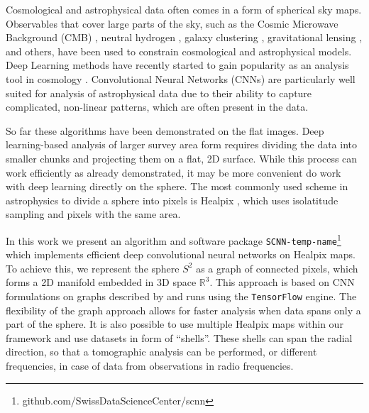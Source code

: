 \documentclass[final,twocolumn,3p,times,authoryear]{elsarticle}
\newcommand{\1}{\b{1}}              %
\newcommand{\0}{\b{0}}              %
\newcommand{\pkg}[1]{\texttt{#1}}
\begin{document}
Cosmological and astrophysical data often comes in a form of spherical sky maps.
Observables that cover large parts of the sky, such as the Cosmic Microwave Background (CMB) \citep{planck2015cosmologicalparameters,komatsu2011sevenyear,staggs2018recentdiscoveries}, neutral hydrogen \citep{santos2015cosmologySKA,HI4PI2016fullskyHI}, galaxy clustering \citep{alam2017clusteringgalaxies}, gravitational lensing \citep{troxel2017darkenergy,hildebrandt2017kidscosmological}, and others, have been used to constrain cosmological and astrophysical models. Deep Learning methods have recently started to gain popularity as an analysis tool in cosmology \citep{schmelze2017cosmologicalmodel,luciesmith2018machinelearning,gupta2018nongaussianinformation,gillet2018deeplearning,hassan2018reionizationmodels,aragoncalvo2018classyfyinglarge,ciuca2017cnnstring}.
Convolutional Neural Networks (CNNs) are particularly well suited for analysis of astrophysical data due to their ability to capture complicated, non-linear patterns, which are often present in the data.

So far these algorithms have been demonstrated on the flat images.
Deep learning-based analysis of larger survey area form requires dividing the data into smaller chunks and projecting them on a flat, 2D surface.
While this process can work efficiently as already demonstrated, it may be more convenient do work with deep learning directly on the sphere.
The most commonly used scheme in astrophysics to divide a sphere into pixels is Healpix \citep{gorski2005healpix}, which uses isolatitude sampling and pixels with the same area.

In this work we present an algorithm and software package \pkg{SCNN-temp-name}\footnote{github.com/SwissDataScienceCenter/scnn} which implements efficient deep convolutional neural networks on Healpix maps.
To achieve this, we represent the sphere $S^2$ as a graph of connected pixels, which forms a 2D manifold embedded in 3D space $\mathbb{R}^3$.
This approach is based on CNN formulations on graphs described by \citet{defferrard2016convolutional} and runs using the \pkg{TensorFlow} \citep{abadi2016tensorflow} engine.
The flexibility of the graph approach allows for faster analysis when data spans only a part of the sphere.
It is also possible to use multiple Healpix maps within our framework and use datasets in form of ``shells''.
These shells can span the radial direction, so that a tomographic analysis can be performed, or different frequencies, in case of data from observations in radio frequencies.
\end{document}

